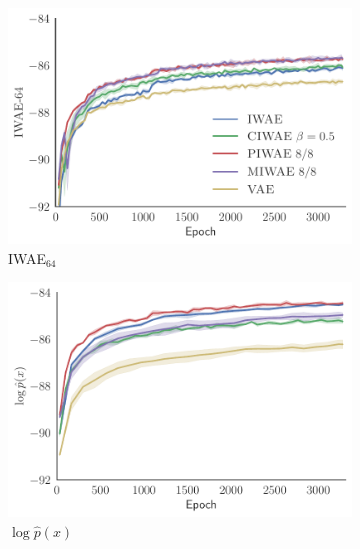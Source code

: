 
\begin{figure}[t!]
	\centering
	\begin{subfigure}[b]{0.33\textwidth}
		\centering
		\includegraphics[width=\textwidth]{figures/tighter_bounds/convergence_IWAE_64}
		\caption{\textsc{IWAE}$_{64}$ \label{fig:mnistexpt/convergence/iwae64}}
	\end{subfigure}
	\begin{subfigure}[b]{0.33\textwidth}
		\centering
		\includegraphics[width=\textwidth]{figures/tighter_bounds/convergence_log_p(x)}
		\caption{$\log \hat{p}(x)$ \label{fig:mnistexpt/convergence/logpx}}
	\end{subfigure}
	\begin{subfigure}[b]{0.33\textwidth}
		\centering

\end{subfigure}
\end{figure}

